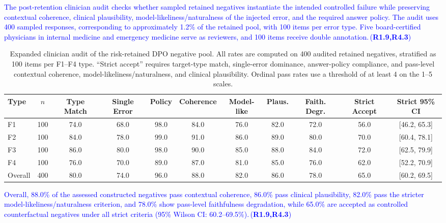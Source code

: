 \documentclass[a4paper,fleqn,doubleblind]{cas-sc}
\DeclareRobustCommand{\added}[1]{\textcolor{blue}{#1}}
\DeclareRobustCommand{\revtag}[1]{\textcolor{blue}{\scriptsize\,(\textbf{#1})}}
\begin{document}
\added{The post-retention clinician audit checks whether sampled retained negatives instantiate the intended controlled failure while preserving contextual coherence, clinical plausibility, model-likeliness/naturalness of the injected error, and the required answer policy. The audit uses 400 sampled responses, corresponding to approximately 1.2\% of the retained pool, with 100 items per error type. Five board-certified physicians in internal medicine and emergency medicine serve as reviewers, and 100 items receive double annotation.}\revtag{R1.9,R4.3}

\begin{table}[htbp]
    \centering
    \begingroup\color{blue}
    \footnotesize
    \caption{Expanded clinician audit of the risk-retained DPO negative pool. All rates are computed on 400 audited retained negatives, stratified as 100 items per F1--F4 type. ``Strict accept'' requires target-type match, single-error dominance, answer-policy compliance, and pass-level contextual coherence, model-likeliness/naturalness, and clinical plausibility. Ordinal pass rates use a threshold of at least 4 on the 1--5 scales.}
    \label{tab:negative_quality}
    \begin{adjustbox}{max width=\textwidth}
    \begin{tabular}{lcccccccccc}
        \toprule
        \textbf{Type} & \textbf{$n$} & \textbf{Type Match} & \textbf{Single Error} & \textbf{Policy} & \textbf{Coherence} & \textbf{Model-like} & \textbf{Plaus.} & \textbf{Faith. Degr.} & \textbf{Strict Accept} & \textbf{Strict 95\% CI} \\
        \midrule
        F1 & 100 & 74.0 & 68.0 & 98.0 & 84.0 & 76.0 & 82.0 & 72.0 & 56.0 & [46.2, 65.3] \\
        F2 & 100 & 84.0 & 78.0 & 99.0 & 91.0 & 86.0 & 89.0 & 80.0 & 70.0 & [60.4, 78.1] \\
        F3 & 100 & 86.0 & 80.0 & 98.0 & 90.0 & 85.0 & 88.0 & 84.0 & 72.0 & [62.5, 79.9] \\
        F4 & 100 & 76.0 & 70.0 & 89.0 & 87.0 & 81.0 & 85.0 & 76.0 & 62.0 & [52.2, 70.9] \\
        \midrule
        Overall & 400 & 80.0 & 74.0 & 96.0 & 88.0 & 82.0 & 86.0 & 78.0 & 65.0 & [60.2, 69.5] \\
        \bottomrule
    \end{tabular}
    \end{adjustbox}
    \endgroup
\end{table}

\added{Overall, 88.0\% of the assessed constructed negatives pass contextual coherence, 86.0\% pass clinical plausibility, 82.0\% pass the stricter model-likeliness/naturalness criterion, and 78.0\% show pass-level faithfulness degradation, while 65.0\% are accepted as controlled counterfactual negatives under all strict criteria (95\% Wilson CI: 60.2--69.5\%).}\revtag{R1.9,R4.3}
\end{document}
